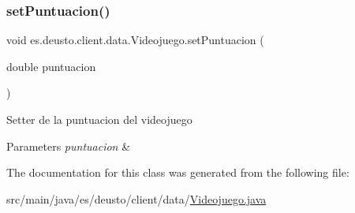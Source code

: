 \subsubsection{\texorpdfstring{setPuntuacion()}{setPuntuacion()}}
{\footnotesize\ttfamily void es.\+deusto.\+client.\+data.\+Videojuego.\+set\+Puntuacion (\begin{DoxyParamCaption}\item[{double}]{puntuacion }\end{DoxyParamCaption})}

Setter de la puntuacion del videojuego 
\begin{DoxyParams}{Parameters}
{\em puntuacion} & \\
\hline
\end{DoxyParams}


The documentation for this class was generated from the following file\+:\begin{DoxyCompactItemize}
\item 
src/main/java/es/deusto/client/data/\mbox{\hyperlink{_videojuego_8java}{Videojuego.\+java}}\end{DoxyCompactItemize}
